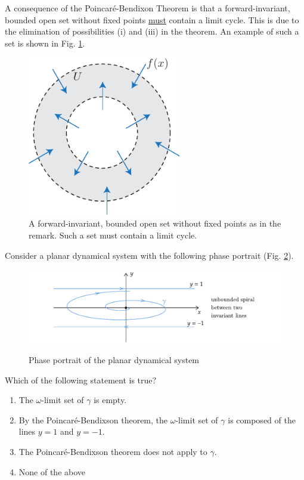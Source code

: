 \begin{remark}[]
	A consequence of the Poincaré-Bendixon Theorem is that a forward-invariant, bounded open set without fixed points \underline{must} contain a limit cycle. This is due to the elimination of possibilities (i) and (iii) in the theorem. An example of such a set is shown in Fig. \ref{fig:PB_consequence}.
	\begin{figure}[h!]
		\centering
		\includegraphics[width=0.6\textwidth]{figures/ch4/11PB_consequence.pdf}
		\caption{A forward-invariant, bounded open set without fixed points as in the remark. Such a set must contain a limit cycle.}
		\label{fig:PB_consequence}
	\end{figure}
\end{remark}

\begin{exercise}
	Consider a planar dynamical system with the following phase portrait (Fig. \ref{fig:ex51}).
\begin{figure}[h]
	\centering
	\includegraphics[scale=0.9]{figures/ch4/Series/Q04D01.pdf}
	\label{fig:ex51}
	\caption{Phase portrait of the planar dynamical system}
\end{figure}

Which of the following statement is true?
\begin{enumerate}
	\item The $\omega$-limit set of $\gamma$ is empty.
	\item By the Poincaré-Bendixson theorem, the $\omega$-limit set of $\gamma$ is composed of the lines $y = 1$ and $y = -1$.
	\item The Poincaré-Bendixson theorem does not apply to $\gamma$.
	\item None of the above
\end{enumerate}

\end{exercise}


